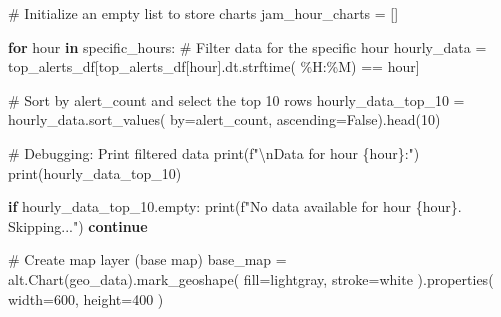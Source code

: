 \documentclass[
  letterpaper,
  DIV=11,
  numbers=noendperiod]{scrartcl}
\newenvironment{Shaded}{\begin{snugshade}}{\end{snugshade}}
\newcommand{\BuiltInTok}[1]{\textcolor[rgb]{0.00,0.23,0.31}{#1}}
\newcommand{\CharTok}[1]{\textcolor[rgb]{0.13,0.47,0.30}{#1}}
\newcommand{\CommentTok}[1]{\textcolor[rgb]{0.37,0.37,0.37}{#1}}
\newcommand{\ControlFlowTok}[1]{\textcolor[rgb]{0.00,0.23,0.31}{\textbf{#1}}}
\newcommand{\DecValTok}[1]{\textcolor[rgb]{0.68,0.00,0.00}{#1}}
\newcommand{\KeywordTok}[1]{\textcolor[rgb]{0.00,0.23,0.31}{\textbf{#1}}}
\newcommand{\NormalTok}[1]{\textcolor[rgb]{0.00,0.23,0.31}{#1}}
\newcommand{\OperatorTok}[1]{\textcolor[rgb]{0.37,0.37,0.37}{#1}}
\newcommand{\SpecialCharTok}[1]{\textcolor[rgb]{0.37,0.37,0.37}{#1}}
\newcommand{\SpecialStringTok}[1]{\textcolor[rgb]{0.13,0.47,0.30}{#1}}
\newcommand{\StringTok}[1]{\textcolor[rgb]{0.13,0.47,0.30}{#1}}
\newcommand{\VariableTok}[1]{\textcolor[rgb]{0.07,0.07,0.07}{#1}}
\begin{document}
\begin{Shaded}
\begin{Highlighting}[]
\CommentTok{\# Initialize an empty list to store charts}
\NormalTok{jam\_hour\_charts }\OperatorTok{=}\NormalTok{ []}

\ControlFlowTok{for}\NormalTok{ hour }\KeywordTok{in}\NormalTok{ specific\_hours:}
    \CommentTok{\# Filter data for the specific hour}
\NormalTok{    hourly\_data }\OperatorTok{=}\NormalTok{ top\_alerts\_df[top\_alerts\_df[}\StringTok{\textquotesingle{}hour\textquotesingle{}}\NormalTok{].dt.strftime(}
        \StringTok{\textquotesingle{}\%H:\%M\textquotesingle{}}\NormalTok{) }\OperatorTok{==}\NormalTok{ hour]}

    \CommentTok{\# Sort by alert\_count and select the top 10 rows}
\NormalTok{    hourly\_data\_top\_10 }\OperatorTok{=}\NormalTok{ hourly\_data.sort\_values(}
\NormalTok{        by}\OperatorTok{=}\StringTok{\textquotesingle{}alert\_count\textquotesingle{}}\NormalTok{, ascending}\OperatorTok{=}\VariableTok{False}\NormalTok{).head(}\DecValTok{10}\NormalTok{)}

    \CommentTok{\# Debugging: Print filtered data}
    \BuiltInTok{print}\NormalTok{(}\SpecialStringTok{f"}\CharTok{\textbackslash{}n}\SpecialStringTok{Data for hour }\SpecialCharTok{\{}\NormalTok{hour}\SpecialCharTok{\}}\SpecialStringTok{:"}\NormalTok{)}
    \BuiltInTok{print}\NormalTok{(hourly\_data\_top\_10)}

    \ControlFlowTok{if}\NormalTok{ hourly\_data\_top\_10.empty:}
        \BuiltInTok{print}\NormalTok{(}\SpecialStringTok{f"No data available for hour }\SpecialCharTok{\{}\NormalTok{hour}\SpecialCharTok{\}}\SpecialStringTok{. Skipping..."}\NormalTok{)}
        \ControlFlowTok{continue}

    \CommentTok{\# Create map layer (base map)}
\NormalTok{    base\_map }\OperatorTok{=}\NormalTok{ alt.Chart(geo\_data).mark\_geoshape(}
\NormalTok{        fill}\OperatorTok{=}\StringTok{\textquotesingle{}lightgray\textquotesingle{}}\NormalTok{,}
\NormalTok{        stroke}\OperatorTok{=}\StringTok{\textquotesingle{}white\textquotesingle{}}
\NormalTok{    ).properties(}
\NormalTok{        width}\OperatorTok{=}\DecValTok{600}\NormalTok{,}
\NormalTok{        height}\OperatorTok{=}\DecValTok{400}
\NormalTok{    )}


\end{Highlighting}
\end{Shaded}
\end{document}
